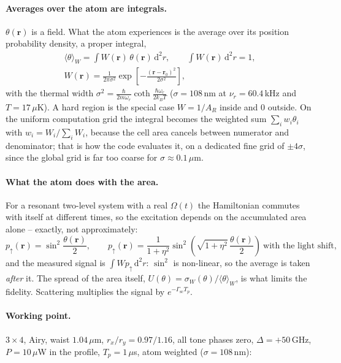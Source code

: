 \paragraph{Averages over the atom are integrals.}
$\theta(\mathbf r)$ is a field. What the atom experiences is the average over
its position probability density, a proper integral,
\begin{gather}
\langle\theta\rangle_W=\int\! W(\mathbf r)\,\theta(\mathbf r)\,\mathrm d^2r,
\qquad \int\! W(\mathbf r)\,\mathrm d^2r=1,\\
W(\mathbf r)=\frac{1}{2\pi\sigma^2}
\exp\!\left[-\frac{(\mathbf r-\mathbf r_0)^2}{2\sigma^2}\right],
\end{gather}
with the thermal width
$\sigma^2=\frac{\hbar}{2m\omega_r}\coth\frac{\hbar\omega_r}{2k_BT}$
($\sigma=108$\,nm at $\nu_r=60.4$\,kHz and $T=17\,\mu$K). A hard region is the
special case $W=1/A_R$ inside and $0$ outside. On the uniform computation grid
the integral becomes the weighted sum
$\sum_i w_i\theta_i$ with $w_i=W_i/\sum_iW_i$, because the cell area cancels
between numerator and denominator; that is how the code evaluates it, on a
dedicated fine grid of $\pm4\sigma$, since the global grid is far too coarse for
$\sigma\approx0.1\,\mu$m.

\paragraph{What the atom does with the area.}
For a resonant two-level system with a real $\Omega(t)$ the Hamiltonian
commutes with itself at different times, so the excitation depends on the
accumulated area alone -- exactly, not approximately:
\begin{equation}
p_\uparrow(\mathbf r)=\sin^2\frac{\theta(\mathbf r)}{2},
\qquad
p_\uparrow(\mathbf r)=\frac{1}{1+\eta^2}
\sin^2\!\left(\sqrt{1+\eta^2}\,\frac{\theta(\mathbf r)}{2}\right)
\ \text{with the light shift},
\end{equation}
and the measured signal is $\int W p_\uparrow\,\mathrm d^2r$: $\sin^2$ is
non-linear, so the average is taken \emph{after} it. The spread of the area
itself, $U(\theta)=\sigma_W(\theta)/\langle\theta\rangle_W$, is what limits the
fidelity. Scattering multiplies the signal by $e^{-\Gamma_\mathrm{sc}T_p}$.

\paragraph{Working point.}
$3\times4$, Airy, waist $1.04\,\mu$m, $r_x/r_y=0.97/1.16$, all tone phases
zero, $\Delta=+50$\,GHz, $P=10\,\mu$W in the profile, $T_p=1\,\mu$s, atom
weighted ($\sigma=108$\,nm):

